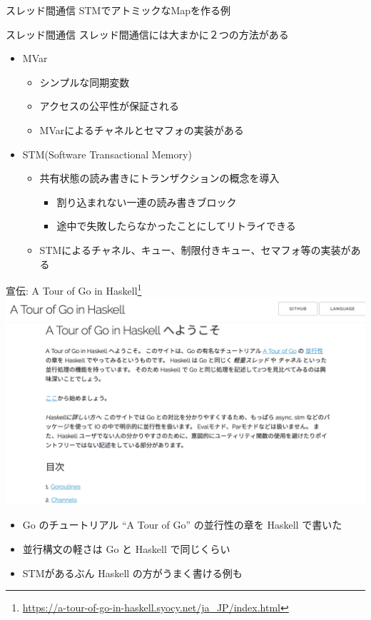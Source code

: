 \documentclass[unicode,12pt]{beamer}
\begin{document}
\begin{frame}{スレッド間通信}
  STMでアトミックなMapを作る例
  
\end{frame}

\begin{frame}{スレッド間通信}
  スレッド間通信には大まかに２つの方法がある
  \begin{itemize}
  \item {\ttfamily MVar}
    \begin{itemize}
    \item シンプルな同期変数
    \item アクセスの\alert{公平性}が保証される
    \item MVarによるチャネルとセマフォの実装がある
    \end{itemize}
  \item STM(Software Transactional Memory)
    \begin{itemize}
    \item 共有状態の読み書きに\alert{トランザクション}の概念を導入
      \begin{itemize}
      \item 割り込まれない一連の読み書きブロック
      \item 途中で失敗したらなかったことにしてリトライできる
      \end{itemize}
    \item STMによるチャネル、キュー、制限付きキュー、セマフォ等の実装がある
    \end{itemize}
  \end{itemize}
\end{frame}

\begin{frame}{宣伝: A Tour of Go in Haskell\footnote{\url{https://a-tour-of-go-in-haskell.syocy.net/ja_JP/index.html}}}
  \centering
  \includegraphics[width=.55\textwidth]{pic/a_tour_of_go_in_haskell.png}
  \begin{itemize}
  \item Go のチュートリアル ``A Tour of Go'' の並行性の章を Haskell で書いた
  \item 並行構文の軽さは Go と Haskell で同じくらい
  \item STMがあるぶん Haskell の方がうまく書ける例も
  \end{itemize}
\end{frame}
\end{document}

